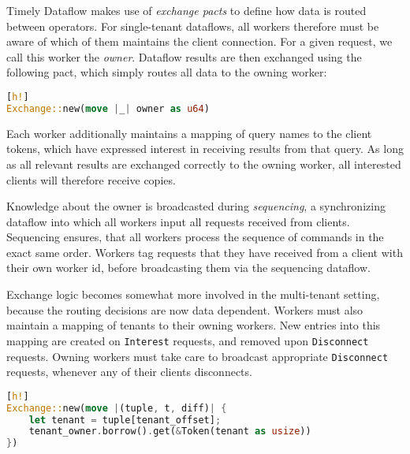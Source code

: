 \documentclass[../index.tex]{subfiles}
\begin{document}
Timely Dataflow makes use of \emph{exchange pacts} to define how data
is routed between operators. For single-tenant dataflows, all workers
therefore must be aware of which of them maintains the client
connection. For a given request, we call this worker the
\emph{owner}. Dataflow results are then exchanged using the following
pact, which simply routes all data to the owning worker:

\begin{lstlisting}[language=Rust, style=colouredRust][h!]
Exchange::new(move |_| owner as u64)
\end{lstlisting}

Each worker additionally maintains a mapping of query names to the
client tokens, which have expressed interest in receiving results from
that query. As long as all relevant results are exchanged correctly to
the owning worker, all interested clients will therefore receive
copies.

Knowledge about the owner is broadcasted during \emph{sequencing}, a
synchronizing dataflow into which all workers input all requests
received from clients. Sequencing ensures, that all workers process
the sequence of commands in the exact same order. Workers tag requests
that they have received from a client with their own worker id, before
broadcasting them via the sequencing dataflow.

Exchange logic becomes somewhat more involved in the multi-tenant
setting, because the routing decisions are now data dependent. Workers
must also maintain a mapping of tenants to their owning workers. New
entries into this mapping are created on \texttt{Interest} requests,
and removed upon \texttt{Disconnect} requests. Owning workers must
take care to broadcast appropriate \texttt{Disconnect} requests,
whenever any of their clients disconnects.

\begin{lstlisting}[language=Rust, style=colouredRust][h!]
Exchange::new(move |(tuple, t, diff)| {
    let tenant = tuple[tenant_offset];
    tenant_owner.borrow().get(&Token(tenant as usize))
})
\end{lstlisting}
\end{document}
